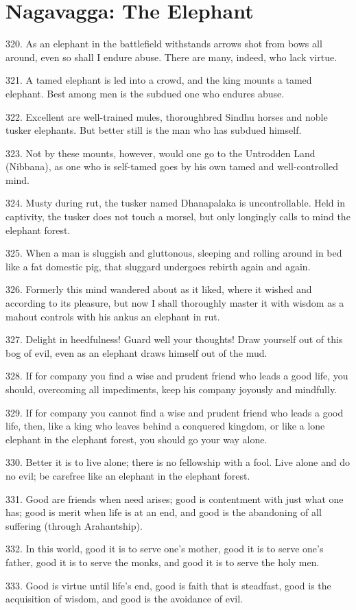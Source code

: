 \newpage
\chapter{Nagavagga: The Elephant}
320. As an elephant in the battlefield withstands arrows shot from bows all around, even so shall I endure abuse. There are many, indeed, who lack virtue.

321. A tamed elephant is led into a crowd, and the king mounts a tamed elephant. Best among men is the subdued one who endures abuse.

322. Excellent are well-trained mules, thoroughbred Sindhu horses and noble tusker elephants. But better still is the man who has subdued himself.

323. Not by these mounts, however, would one go to the Untrodden Land (Nibbana), as one who is self-tamed goes by his own tamed and well-controlled mind.

324. Musty during rut, the tusker named Dhanapalaka is uncontrollable. Held in captivity, the tusker does not touch a morsel, but only longingly calls to mind the elephant forest.

325. When a man is sluggish and gluttonous, sleeping and rolling around in bed like a fat domestic pig, that sluggard undergoes rebirth again and again.

326. Formerly this mind wandered about as it liked, where it wished and according to its pleasure, but now I shall thoroughly master it with wisdom as a mahout controls with his ankus an elephant in rut.

327. Delight in heedfulness! Guard well your thoughts! Draw yourself out of this bog of evil, even as an elephant draws himself out of the mud.

328. If for company you find a wise and prudent friend who leads a good life, you should, overcoming all impediments, keep his company joyously and mindfully.

329. If for company you cannot find a wise and prudent friend who leads a good life, then, like a king who leaves behind a conquered kingdom, or like a lone elephant in the elephant forest, you should go your way alone.

330. Better it is to live alone; there is no fellowship with a fool. Live alone and do no evil; be carefree like an elephant in the elephant forest.

331. Good are friends when need arises; good is contentment with just what one has; good is merit when life is at an end, and good is the abandoning of all suffering (through Arahantship).

332. In this world, good it is to serve one's mother, good it is to serve one's father, good it is to serve the monks, and good it is to serve the holy men.

333. Good is virtue until life's end, good is faith that is steadfast, good is the acquisition of wisdom, and good is the avoidance of evil.
